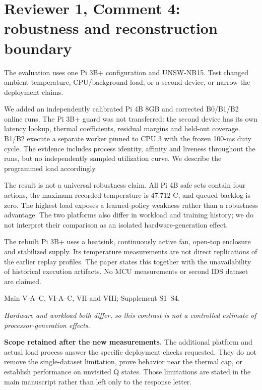 \documentclass[10pt,a4paper]{article}
\newcommand{\commentbox}[1]{\begin{rcommentbox}#1\end{rcommentbox}}
\newcommand{\responsebox}[1]{\begin{authorresponsebox}#1\end{authorresponsebox}}
\newcommand{\changebox}[1]{\begin{wherebox}#1\end{wherebox}}
\begin{document}
\clearpage
\section*{Reviewer 1, Comment 4: robustness and reconstruction boundary}
\commentbox{The evaluation uses one Pi 3B+ configuration and UNSW-NB15. Test changed ambient temperature, CPU/background load, or a second device, or narrow the deployment claims.}
\responsebox{We added an independently calibrated Pi 4B 8GB and corrected B0/B1/B2 online runs. The Pi 3B+ guard was not transferred: the second device has its own latency lookup, thermal coefficients, residual margins and held-out coverage. B1/B2 execute a separate worker pinned to CPU 3 with the frozen 100-ms duty cycle. The evidence includes process identity, affinity and liveness throughout the runs, but no independently sampled utilization curve. We describe the programmed load accordingly.

The result is not a universal robustness claim. All Pi 4B safe sets contain four actions, the maximum recorded temperature is $47.712^\circ$C, and queued backlog is zero. The highest load exposes a learned-policy weakness rather than a robustness advantage. The two platforms also differ in workload and training history; we do not interpret their comparison as an isolated hardware-generation effect.

The rebuilt Pi 3B+ uses a heatsink, continuously active fan, open-top enclosure and stabilized supply. Its temperature measurements are not direct replications of the earlier replay profiles. The paper states this together with the unavailability of historical execution artifacts. No MCU measurements or second IDS dataset are claimed.}
\changebox{Main V-A--C, VI-A--C, VII and VIII; Supplement S1--S4.}
\begin{excerptbox}\emph{Hardware and workload both differ, so this contrast is not a controlled estimate of processor-generation effects.}\end{excerptbox}

\begin{authorresponsebox}
\textbf{Scope retained after the new measurements.} The additional platform and actual load process answer the specific deployment checks requested. They do not remove the single-dataset limitation, prove behavior near the thermal cap, or establish performance on unvisited Q states. Those limitations are stated in the main manuscript rather than left only to the response letter.
\end{authorresponsebox}
\end{document}
